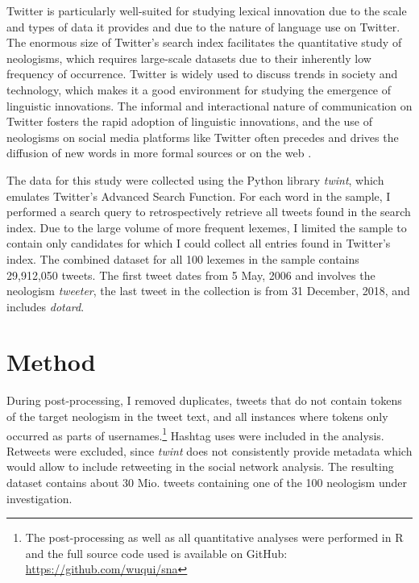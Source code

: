 \documentclass[
  a4paper,
  abstract=on,
  captions=tableabove
  ]{scrartcl}
\begin{document}
    Twitter is particularly well-suited for studying lexical innovation due to the scale and types of data it provides and due to the nature of language use on Twitter. The enormous size of Twitter's search index facilitates the quantitative study of neologisms, which requires large-scale datasets due to their inherently low frequency of occurrence. Twitter is widely used to discuss trends in society and technology, which makes it a good environment for studying the emergence of linguistic innovations. The informal and interactional nature of communication on Twitter fosters the rapid adoption of linguistic innovations, and the use of neologisms on social media platforms like Twitter often precedes and drives the diffusion of new words in more formal sources or on the web \parencite{Wurschinger2016UsingWeb}.


    The data for this study were collected using the Python library \emph{twint}, which emulates Twitter's Advanced Search Function. For each word in the sample, I performed a search query to retrospectively retrieve all tweets found in the search index. Due to the large volume of more frequent lexemes, I limited the sample to contain only candidates for which I could collect all entries found in Twitter's index. The combined dataset for all 100 lexemes in the sample contains 29,912,050 tweets. The first tweet dates from 5 May, 2006 and involves the neologism \emph{tweeter}, the last tweet in the collection is from 31 December, 2018, and includes \emph{dotard}.

\section{Method}
  \label{sec:method}

  During post-processing, I removed duplicates, tweets that do not contain tokens of the target neologism in the tweet text, and all instances where tokens only occurred as parts of usernames.\footnote{The post-processing as well as all quantitative analyses were performed in R~\parencite{RCoreTeam2018LanguageEnvironment} and the full source code used is available on GitHub: \url{https://github.com/wuqui/sna}} Hashtag uses were included in the analysis. Retweets were excluded, since \emph{twint} does not consistently provide metadata which would allow to include retweeting in the social network analysis. The resulting dataset contains about 30 Mio. tweets containing one of the 100 neologism under investigation.
\end{document}
